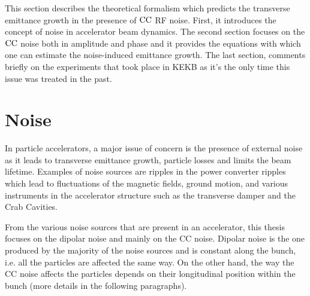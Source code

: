 This section describes the theoretical formalism which predicts the transverse emittance growth in the presence of ${\mathrm{CC}}$ RF noise. First, it introduces the concept of noise in accelerator beam dynamics. The second section focuses on the ${\mathrm{CC}}$ noise both in amplitude and phase and it provides the equations with which one can estimate the noise-induced emittance growth. The last section, comments briefly on the experiments that took place in KEKB as it's the only time this issue was treated in the past. 



\section{Noise}\label{sec:noise_definition}
In particle accelerators, a major issue of concern is the presence of external noise as it leads to transverse emittance growth, particle losses and limits the beam lifetime. Examples of noise sources are ripples in the power converter ripples which lead to fluctuations of the magnetic fields, ground motion, and various instruments in the accelerator structure such as the transverse damper and the Crab Cavities. %

From the various noise sources that are present in an accelerator, this thesis focuses on the dipolar noise and mainly on the CC noise. Dipolar noise is the one produced by the majority of the noise sources and is constant along the bunch, i.e. all the particles are affected the same way. %
On the other hand, the way the CC noise affects the particles depends on their longitudinal position within the bunch (more details in the following paragraphs).

